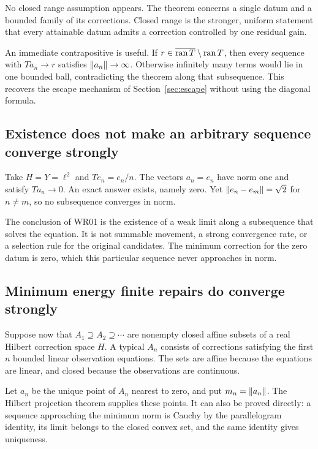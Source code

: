 No closed range assumption appears. The theorem concerns a single datum and a bounded family of its corrections. Closed range is the stronger, uniform statement that every attainable datum admits a correction controlled by one residual gain.

An immediate contrapositive is useful. If $r\in\overline{\operatorname{ran} T}\setminus\operatorname{ran} T$, then every sequence with $Ta_n\to r$ satisfies $\left\lVert a_n\right\rVert\to\infty$. Otherwise infinitely many terms would lie in one bounded ball, contradicting the theorem along that subsequence. This recovers the escape mechanism of Section~\ref{sec:escape} without using the diagonal formula.

\subsection{Existence does not make an arbitrary sequence converge strongly}
Take $H=Y=\ell^2$ and $Te_n=e_n/n$. The vectors $a_n=e_n$ have norm one and satisfy $Ta_n\to0$. An exact answer exists, namely zero. Yet $\left\lVert e_n-e_m\right\rVert=\sqrt2$ for $n\ne m$, so no subsequence converges in norm.

The conclusion of WR01 is the existence of a weak limit along a subsequence that solves the equation. It is not summable movement, a strong convergence rate, or a selection rule for the original candidates. The minimum correction for the zero datum is zero, which this particular sequence never approaches in norm.

\subsection{Minimum energy finite repairs do converge strongly}

Suppose now that $A_1\supseteq A_2\supseteq\cdots$ are nonempty closed affine subsets of a real Hilbert correction space $H$. A typical $A_n$ consists of corrections satisfying the first $n$ bounded linear observation equations. The sets are affine because the equations are linear, and closed because the observations are continuous.

Let $a_n$ be the unique point of $A_n$ nearest to zero, and put $m_n=\left\lVert a_n\right\rVert$. The Hilbert projection theorem supplies these points. It can also be proved directly: a sequence approaching the minimum norm is Cauchy by the parallelogram identity, its limit belongs to the closed convex set, and the same identity gives uniqueness.

